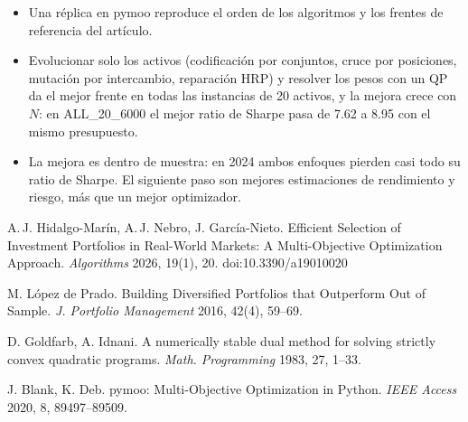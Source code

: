 \vspace{\rowgap}
\hspace*{24mm}%
\begin{minipage}[t]{\wide}\body
  \begin{itemize}
    \item Una réplica en pymoo reproduce el orden de los algoritmos y los frentes de referencia del artículo.
    \item Evolucionar solo los activos (codificación por conjuntos, cruce por posiciones, mutación por
    intercambio, reparación HRP) y resolver los pesos con un QP da el mejor frente en todas las instancias de
    20 activos, y la mejora crece con $N$: en ALL\_20\_6000 el mejor ratio de Sharpe pasa de 7.62 a 8.95 con el
    mismo presupuesto.
    \item La mejora es dentro de muestra: en 2024 ambos enfoques pierden casi todo su ratio de Sharpe. El
    siguiente paso son mejores estimaciones de rendimiento y riesgo, más que un mejor optimizador.
  \end{itemize}
\end{minipage}%
\hspace{\gap}%
\begin{minipage}[t]{\colw}\fontsize{18pt}{23pt}\selectfont\raggedright
  \vspace{-2mm}
  \begin{enumerate}[label={[\arabic*]}, leftmargin=1.8em, itemsep=2mm, topsep=0mm]
    \item A.\,J. Hidalgo-Marín, A.\,J. Nebro, J. García-Nieto. Efficient Selection of Investment Portfolios in
    Real-World Markets: A Multi-Objective Optimization Approach. \emph{Algorithms} 2026, 19(1), 20.
    doi:10.3390/a19010020
    \item M. López de Prado. Building Diversified Portfolios that Outperform Out of Sample. \emph{J. Portfolio
    Management} 2016, 42(4), 59--69.
    \item D. Goldfarb, A. Idnani. A numerically stable dual method for solving strictly convex quadratic
    programs. \emph{Math. Programming} 1983, 27, 1--33.
    \item J. Blank, K. Deb. pymoo: Multi-Objective Optimization in Python. \emph{IEEE Access} 2020, 8,
    89497--89509.
  \end{enumerate}
\end{minipage}


